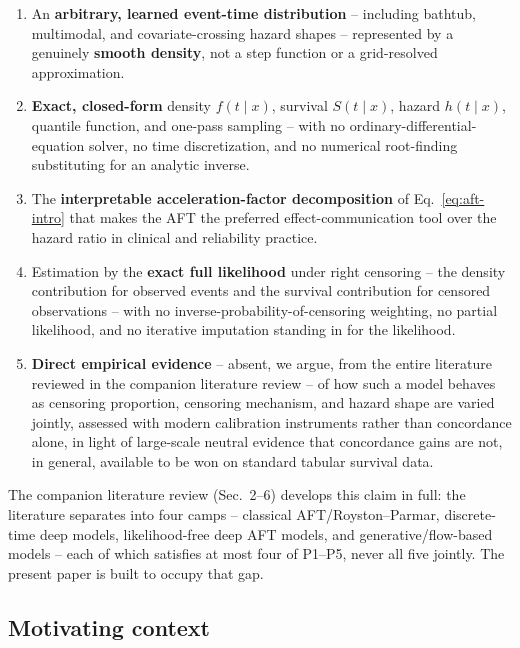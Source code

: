 \documentclass[11pt]{article}
\begin{document}
\begin{enumerate}
  \item[\textbf{P1}] An \textbf{arbitrary, learned event-time
    distribution} -- including bathtub, multimodal, and
    covariate-crossing hazard shapes -- represented by a genuinely
    \textbf{smooth density}, not a step function or a grid-resolved
    approximation.
  \item[\textbf{P2}] \textbf{Exact, closed-form} density $f(t\mid x)$,
    survival $S(t\mid x)$, hazard $h(t\mid x)$, quantile function, and
    one-pass sampling -- with no ordinary-differential-equation solver,
    no time discretization, and no numerical root-finding substituting
    for an analytic inverse.
  \item[\textbf{P3}] The \textbf{interpretable acceleration-factor
    decomposition} of Eq.~\eqref{eq:aft-intro} that makes the AFT the
    preferred effect-communication tool over the hazard ratio in
    clinical and reliability practice.
  \item[\textbf{P4}] Estimation by the \textbf{exact full likelihood}
    under right censoring -- the density contribution for observed
    events and the survival contribution for censored observations --
    with no inverse-probability-of-censoring weighting, no partial
    likelihood, and no iterative imputation standing in for the
    likelihood.
  \item[\textbf{P5}] \textbf{Direct empirical evidence} -- absent, we
    argue, from the entire literature reviewed in
    the companion literature review -- of how such a model
    behaves as censoring proportion, censoring mechanism, and hazard
    shape are varied jointly, assessed with modern calibration
    instruments rather than concordance alone, in light of large-scale
    neutral evidence \citep{burk2024neutral} that concordance gains are
    not, in general, available to be won on standard tabular survival
    data.
\end{enumerate}

The companion literature review (Sec.~2--6) develops this claim in full: the
literature separates into four camps -- classical AFT/Royston--Parmar,
discrete-time deep models, likelihood-free deep AFT models, and
generative/flow-based models -- each of which satisfies at most four of
P1--P5, never all five jointly. The present paper is built to occupy
that gap.

\subsection{Motivating context}
\label{sec:motivating}
\end{document}
